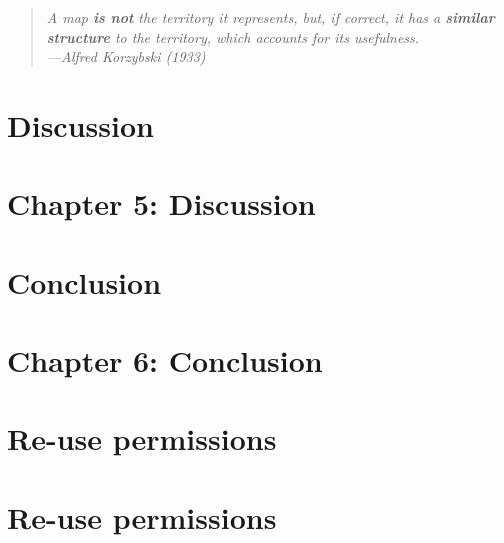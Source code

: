 \documentclass[12pt, TexShade, letterpaper]{report}
\makeatletter
\newcommand{\unchapter}[1]{%
  \begingroup
  \let\@makechapterhead\@gobble %
  \chapter{#1}
  \endgroup
}
\makeatother
\begin{document}
\pagebreak
\hspace{0pt}
\vfill

\begin{center}
\begin{quote} 
\begin{singlespace}
\textit{A map \textbf{is not} the territory it represents, but, if correct, it has a \textbf{similar structure} to the territory, which accounts for its usefulness.\\
---Alfred Korzybski (1933)}
\end{singlespace}
\end{quote}
\end{center}

\vfill
\hspace{0pt}
\pagebreak

\unchapter{Discussion}
\chapter*{Chapter 5: Discussion}
\label{chap:discussion}


\unchapter{Conclusion}
\chapter*{Chapter 6: Conclusion}
\label{chap:conclusion}

\cleardoublepage
{}
\begin{singlespace}
\printbibliography[keyword = mainbib, title={Master reference list}, heading=bibintoc]%
\end{singlespace}

\appendix

\unchapter{Re-use permissions}
\chapter*{Re-use permissions}
\label{appendix:copyright}








\end{document}
